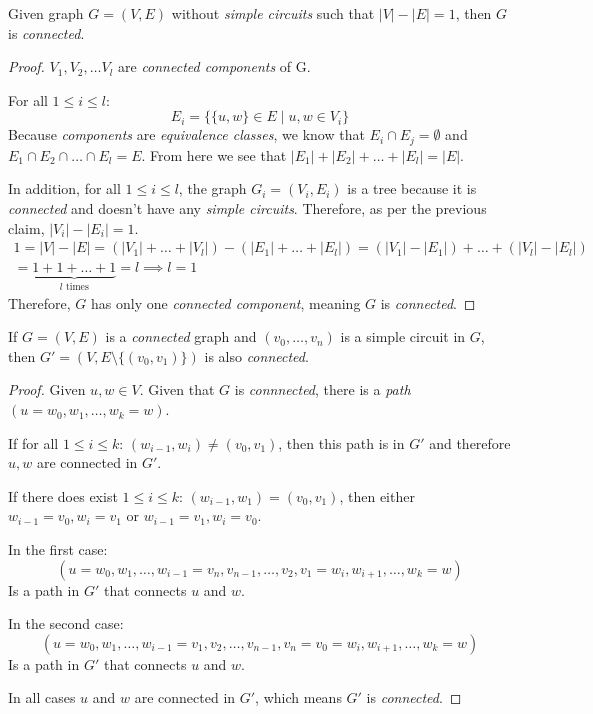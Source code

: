 \documentclass[00_complete]{subfiles}
\begin{document}
\begin{claim}
    Given graph $G=(V,E)$ without \emph{simple circuits} such that
    $|V|-|E|=1$, then $G$ is \emph{connected}.
\end{claim}
\begin{proof}
    $V_1,V_2,\dots V_l$ are \emph{connected components} of G.

    For all $1 \leq i \leq l$:
    $$E_i=\{\{u,w\}\in E \mid u,w \in V_i\}$$
    Because \emph{components} are \emph{equivalence classes}, we know that
    $E_i\cap E_j=\emptyset$ and $E_1\cap E_2 \cap \dots \cap E_l=E$. From here
    we see that $|E_1|+|E_2|+\dots+|E_l|=|E|$.

    In addition, for all $1 \leq i \leq l$, the graph $G_i=(V_i,E_i)$ is a tree
    because it is \emph{connected} and doesn't have any \emph{simple circuits}.
    Therefore, as per the previous claim, $|V_i|-|E_i|=1$.
    \begin{gather*}
    1=|V|-|E|=(|V_1|+\dots+|V_l|)-(|E_1|+\dots+|E_l|)=(|V_1|-|E_1|)+\dots+(|V_l|-|E_l|)
    \\
    =\underbrace{1+1+\dots+1}_{l \text{ times}}=l \implies l=1
    \end{gather*}
    Therefore, $G$ has only one \emph{connected component}, meaning $G$ is
    \emph{connected}.
\end{proof}
\begin{claim}
    If $G=(V,E)$ is a \emph{connected} graph and $(v_0,\dots,v_n)$ is a
    simple circuit in $G$, then $G'=(V,E\setminus\{(v_0,v_1)\})$ is also
    \emph{connected}.
\end{claim}
\begin{proof}
    Given $u,w \in V$. Given that $G$ is \emph{connnected}, there is a
    \emph{path} $(u=w_0,w_1,\dots,w_k=w)$.

    If for all $1\leq i \leq k$: $(w_{i-1},w_i)\neq (v_0,v_1)$, then this path is
    in $G'$ and therefore $u,w$ are connected in $G'$.

    If there does exist $1 \leq i \leq k$: $(w_{i-1},w_1)=(v_0,v_1)$, then
    either $w_{i-1}=v_0,w_i=v_1$ or $w_{i-1}=v_1,w_i=v_0$.

    In the first case:
    $$(u=w_0,w_1,\dots,w_{i-1}=v_n,v_{n-1},\dots,v_2,v_1=w_i,w_{i+1},\dots,w_k=w)$$
    Is a path in $G'$ that connects $u$ and $w$.

    In the second case:
    $$(u=w_0,w_1,\dots,w_{i-1}=v_1,v_2,\dots,v_{n-1},v_n=v_0=w_i,w_{i+1},\dots,w_k=w)$$
    Is a path in $G'$ that connects $u$ and $w$.

    In all cases $u$ and $w$ are connected in $G'$, which means $G'$ is
    \emph{connected}.
\end{proof}
\end{document}

